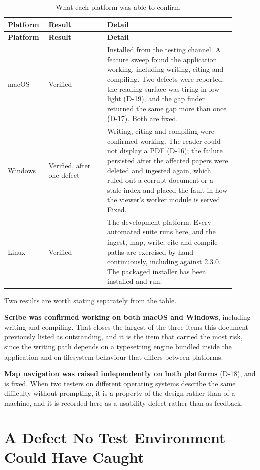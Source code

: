 \documentclass[12pt,a4paper]{report}
\begin{document}
\begin{longtable}{@{}p{0.14\linewidth}p{0.24\linewidth}p{0.52\linewidth}@{}}
\caption{What each platform was able to confirm}\label{tab:platforms}\\
\toprule
\textbf{Platform} & \textbf{Result} & \textbf{Detail} \\
\midrule
\endfirsthead
\toprule
\textbf{Platform} & \textbf{Result} & \textbf{Detail} \\
\midrule
\endhead

macOS & Verified & Installed from the testing channel. A feature sweep found
  the application working, including writing, citing and compiling. Two defects
  were reported: the reading surface was tiring in low light (D-19), and the
  gap finder returned the same gap more than once (D-17). Both are fixed. \\
\addlinespace
Windows & Verified, after one defect & Writing, citing and compiling were
  confirmed working. The reader could not display a PDF (D-16); the failure
  persisted after the affected papers were deleted and ingested again, which
  ruled out a corrupt document or a stale index and placed the fault in how the
  viewer's worker module is served. Fixed. \\
\addlinespace
Linux & Verified & The development platform. Every automated suite runs here,
  and the ingest, map, write, cite and compile paths are exercised by hand
  continuously, including against 2.3.0. The packaged installer has been
  installed and run. \\
\bottomrule
\end{longtable}

Two results are worth stating separately from the table.

\textbf{Scribe was confirmed working on both macOS and Windows}, including
writing and compiling. That closes the largest of the three items this document
previously listed as outstanding, and it is the item that carried the most
risk, since the writing path depends on a typesetting engine bundled inside the
application and on filesystem behaviour that differs between platforms.

\textbf{Map navigation was raised independently on both platforms} (D-18), and
is fixed.
When two testers on different operating systems describe the same difficulty
without prompting, it is a property of the design rather than of a machine, and
it is recorded here as a usability defect rather than as feedback.

\section{A Defect No Test Environment Could Have Caught}\label{sec:nolayout}
\end{document}
